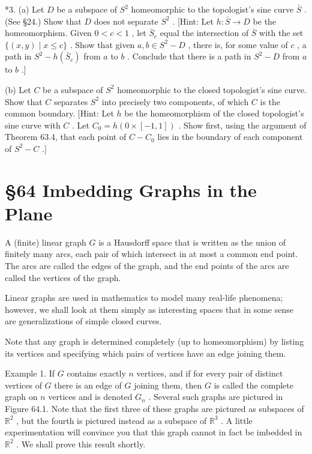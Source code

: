 \documentclass[10pt]{article}
\begin{document}
*3. (a) Let \(D\) be a subspace of \({S}^{2}\) homeomorphic to the topologist’s sine curve \(\bar{S}\) . (See §24.) Show that \(D\) does not separate \({S}^{2}\) . [Hint: Let \(h : \bar{S} \rightarrow  D\) be the homeomorphism. Given \(0 < c < 1\) , let \({\bar{S}}_{c}\) equal the intersection of \(\bar{S}\) with the set \(\{ \left( {x,y}\right)  \mid  x \leq  c\}\) . Show that given \(a,b \in  {S}^{2} - D\) , there is, for some value of \(c\) , a path in \({S}^{2} - h\left( {\bar{S}}_{c}\right)\) from \(a\) to \(b\) . Conclude that there is a path in \({S}^{2} - D\) from \(a\) to \(b\) .]

(b) Let \(C\) be a subspace of \({S}^{2}\) homeomorphic to the closed topologist’s sine curve. Show that \(C\) separates \({S}^{2}\) into precisely two components, of which \(C\) is the common boundary. [Hint: Let \(h\) be the homeomorphism of the closed topologist’s sine curve with \(C\) . Let \({C}_{0} = h\left( {0 \times  \left\lbrack  {-1,1}\right\rbrack  }\right)\) . Show first, using the argument of Theorem 63.4, that each point of \(C - {C}_{0}\) lies in the boundary of each component of \({S}^{2} - C\) .]

\section*{§64 Imbedding Graphs in the Plane}

A (finite) linear graph \(G\) is a Hausdorff space that is written as the union of finitely many arcs, each pair of which intersect in at most a common end point. The arcs are called the edges of the graph, and the end points of the arcs are called the vertices of the graph.

Linear graphs are used in mathematics to model many real-life phenomena; however, we shall look at them simply as interesting spaces that in some sense are generalizations of simple closed curves.

Note that any graph is determined completely (up to homeomorphism) by listing its vertices and specifying which pairs of vertices have an edge joining them.

Example 1. If \(G\) contains exactly \(n\) vertices, and if for every pair of distinct vertices of \(G\) there is an edge of \(G\) joining them, then \(G\) is called the complete graph on \(n\) vertices and is denoted \({G}_{n}\) . Several such graphs are pictured in Figure 64.1. Note that the first three of these graphs are pictured as subspaces of \({\mathbb{R}}^{2}\) , but the fourth is pictured instead as a subspace of \({\mathbb{R}}^{3}\) . A little experimentation will convince you that this graph cannot in fact be imbedded in \({\mathbb{R}}^{2}\) . We shall prove this result shortly.
\end{document}
